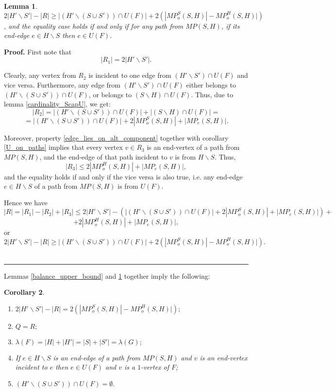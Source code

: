 \documentclass[a4paper, 12pt]{article}
\newtheorem{lemma}{Lemma}[subsection]
\newtheorem{corollary}[lemma]{Corollary}
\newenvironment{proof}[1][Proof]{\noindent\textbf{#1.} }{\ \rule{0.5em}{0.5em}}
\begin{document}
\begin{lemma}\label{balance_lower_bound}
$2|H' \backslash S'| - |R| \geq |(H' \backslash (S \cup S')) \cap
U(F)| + 2(|MP_o^S(S,H)| - MP_o^H(S,H)|)$, and the equality case
holds if and only if for any path from $MP(S,H)$, if its end-edge $e
\in H \backslash S$ then $e \in U(F)$.
\end{lemma}
\begin{proof}
First note that
$$|R_1| = 2|H' \backslash S'|.$$

Clearly, any vertex from $R_2$ is incident to one edge from $(H'
\backslash S') \cap U(F)$ and vice versa. Furthermore, any edge from
$(H' \backslash S') \cap U(F)$ either belongs to $(H' \backslash (S
\cup S')) \cap U(F)$, or belongs to $(S \backslash H) \cap U(F)$.
Thus, due to lemma \ref{cardinality_ScapU}, we get:
$$|R_2| = |(H' \backslash (S \cup S')) \cap U(F)| + |(S
\backslash H) \cap U(F)| =$$$$= |(H' \backslash (S \cup S')) \cap
U(F)| + 2|MP_o^S(S,H)| + |MP_e(S,H)|.$$

Moreover, property \ref{edge_lies_on_alt_component} together with
corollary \ref{U_on_paths} implies that every vertex $v \in R_3$ is
an end-vertex of a path from $MP(S,H)$, and the end-edge of that
path incident to $v$ is from $H \backslash S$. Thus,
\setcounter{equation}{0}
$$|R_3| \leq 2|MP_o^H(S,H)| + |MP_e(S,H)|,$$
and the equality holds if and only if the vice versa is also true,
i.e. any end-edge $e \in H \backslash S$ of a path from $MP(S,H)$ is
from $U(F)$.

Hence we have
$$|R| = |R_1| - |R_2| + |R_3| \leq 2|H' \backslash S'| - (|(H' \backslash (S \cup S')) \cap U(F)|
+ 2|MP_o^S(S,H)| + |MP_e(S,H)|) +$$$$ + 2|MP_o^H(S,H)| +
|MP_e(S,H)|,$$ or
$$2|H' \backslash S'| - |R| \geq |(H' \backslash (S \cup S')) \cap U(F)|
+ 2(|MP_o^S(S,H)| - MP_o^H(S,H)|).$$
\end{proof}

\bigskip

Lemmas \ref{balance_upper_bound} and \ref{balance_lower_bound}
together imply the following:
\begin{corollary}\label{balance_corollaries}\
\renewcommand{\labelenumi}{(\arabic{enumi})}
\begin{enumerate}
\item \label{balance_equality}
$2|H' \backslash S'| - |R| = 2(|MP_o^S(S,H)| - MP_o^H(S,H)|);$

\item \label{Q=R}
$Q = R;$

\item \label{lambda_remains_the_same}
$\lambda(F) = |H| + |H'| = |S| + |S'| = \lambda(G);$

\item \label{H_on_U}
If $e \in H \backslash S$ is an end-edge of a path from $MP(S,H)$
and $v$ is an end-vertex incident to $e$ then $e \in U(F)$ and $v$
is a $1$-vertex of $F$;

\item \label{clear_H'_not_in_U}
$(H' \backslash (S \cup S')) \cap U(F) = \emptyset.$
\end{enumerate}
\end{corollary}
\end{document}
